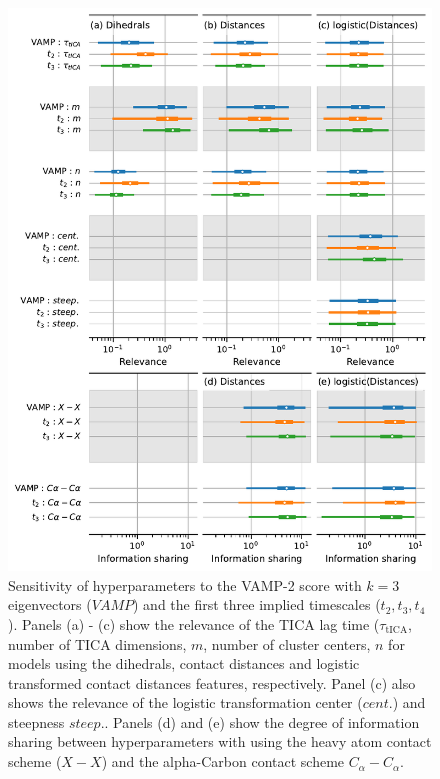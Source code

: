 \documentclass{article}
\begin{document}
\begin{figure}[h]
    \centering
    \includegraphics[height=0.7\textheight]{figures/sensitivities/2f4k_sensitivity.pdf}
    \caption{Sensitivity of hyperparameters to the VAMP-2 score with $k=3$ eigenvectors ($VAMP$) and the first three implied timescales ($t_2, t_3, t_4$). Panels (a) - (c) show the relevance of the TICA lag time ($\tau_{\mathrm{tICA}}$, number of TICA dimensions, $m$, number of cluster centers, $n$ for models using the dihedrals, contact distances and logistic transformed contact distances features, respectively. Panel (c) also shows the relevance of the logistic transformation center ($cent.$) and steepness $steep.$.  Panels (d) and (e) show the degree of information sharing between hyperparameters with using the heavy atom contact scheme ($X-X$) and the alpha-Carbon contact scheme $C_{\alpha}-C_{\alpha}$. }
    \label{fig:villin_sensitivity}
\end{figure}

\clearpage
\end{document}
